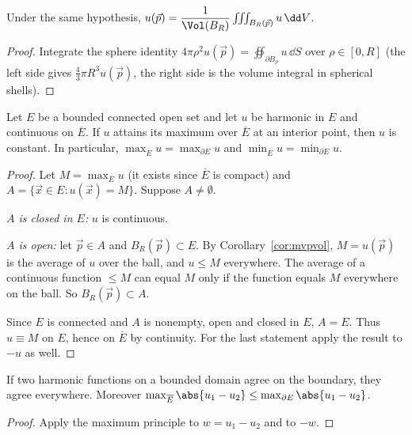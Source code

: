 \begin{corollary}\label{cor:mvpvol}
Under the same hypothesis, $u(\vec p)=\dfrac1{\Vol(B_R)}\iiint_{B_R(\vec p)}u\,\dd V$.
\end{corollary}

\begin{proof}
Integrate the sphere identity $4\pi\rho^2u(\vec p)=\oiint_{\partial B_\rho}u\,\dd S$ over $\rho\in[0,R]$ (the left side gives $\frac43\pi R^3u(\vec p)$, the right side is the volume integral in spherical shells).
\end{proof}

\begin{theorem}\label{thm:maxprinciple}
Let $E$ be a bounded connected open set and let $u$ be harmonic in $E$ and continuous on $\overline E$. If $u$ attains its maximum over $\overline E$ at an interior point, then $u$ is constant. In particular, $\max_{\overline E}u=\max_{\partial E}u$ and $\min_{\overline E}u=\min_{\partial E}u$.
\end{theorem}

\begin{proof}
Let $M=\max_{\overline E}u$ (it exists since $\overline E$ is compact) and $A=\{\vec x\in E:u(\vec x)=M\}$. Suppose $A\ne\emptyset$.

\emph{$A$ is closed in $E$:} $u$ is continuous.

\emph{$A$ is open:} let $\vec p\in A$ and $B_R(\vec p)\subset E$. By Corollary~\ref{cor:mvpvol}, $M=u(\vec p)$ is the average of $u$ over the ball, and $u\le M$ everywhere. The average of a continuous function $\le M$ can equal $M$ only if the function equals $M$ everywhere on the ball. So $B_R(\vec p)\subset A$.

Since $E$ is connected and $A$ is nonempty, open and closed in $E$, $A=E$. Thus $u\equiv M$ on $E$, hence on $\overline E$ by continuity. For the last statement apply the result to $-u$ as well.
\end{proof}

\begin{theorem}\label{thm:dirichlet}
If two harmonic functions on a bounded domain agree on the boundary, they agree everywhere. Moreover $\max_{\overline E}\abs{u_1-u_2}\le\max_{\partial E}\abs{u_1-u_2}$.
\end{theorem}

\begin{proof}
Apply the maximum principle to $w=u_1-u_2$ and to $-w$.
\end{proof}

